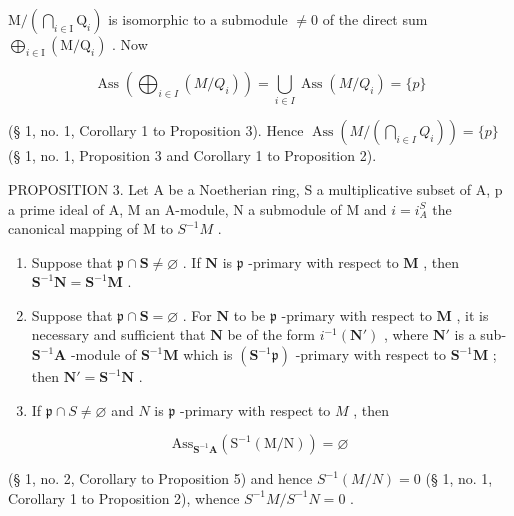 \(\mathrm{M}/\left(\bigcap_{i\in\mathrm{I}}\mathrm{Q}_{i}\right)\) is isomorphic to a submodule \(\neq0\) of the direct sum \(\bigoplus_{i\in\mathrm{I}}(\mathrm{M}/\mathrm{Q}_{i})\) . Now

\[
\operatorname{Ass} \left(\bigoplus_ {i \in I} (M / Q _ {i})\right) = \bigcup_ {i \in I} \operatorname{Ass} (M / Q _ {i}) = \{p \}
\]

(§ 1, no. 1, Corollary 1 to Proposition 3). Hence \(\operatorname{Ass}\left(M / \left(\bigcap_{i \in I} Q_i\right)\right) = \{p\}\) (§ 1, no. 1, Proposition 3 and Corollary 1 to Proposition 2).

PROPOSITION 3. Let A be a Noetherian ring, S a multiplicative subset of A, p a prime ideal of A, M an A-module, N a submodule of M and \(i = i_{A}^{S}\) the canonical mapping of M to \(S^{-1}M\) .

\begin{enumerate}
\def\labelenumi{(\roman{enumi})}
\item
  Suppose that \(\mathfrak{p} \cap \mathbf{S} \neq \varnothing\) . If \(\mathbf{N}\) is \(\mathfrak{p}\) -primary with respect to \(\mathbf{M}\) , then \(\mathbf{S}^{-1}\mathbf{N} = \mathbf{S}^{-1}\mathbf{M}\) .
\item
  Suppose that \(\mathfrak{p} \cap \mathbf{S} = \varnothing\) . For \(\mathbf{N}\) to be \(\mathfrak{p}\) -primary with respect to \(\mathbf{M}\) , it is necessary and sufficient that \(\mathbf{N}\) be of the form \(i^{-1}(\mathbf{N}')\) , where \(\mathbf{N}'\) is a sub- \(\mathbf{S}^{-1}\mathbf{A}\) -module of \(\mathbf{S}^{-1}\mathbf{M}\) which is \((\mathbf{S}^{-1}\mathfrak{p})\) -primary with respect to \(\mathbf{S}^{-1}\mathbf{M}\) ; then \(\mathbf{N}' = \mathbf{S}^{-1}\mathbf{N}\) .
\item
  If \(\mathfrak{p} \cap S \neq \varnothing\) and \(N\) is \(\mathfrak{p}\) -primary with respect to \(M\) , then
\end{enumerate}

\[
\mathrm{Ass} _ {\mathbf {S} ^ {- 1} \mathbf {A}} (\mathrm{S} ^ {- 1} (\mathrm{M} / \mathrm{N})) = \varnothing
\]

(§ 1, no. 2, Corollary to Proposition 5) and hence \(S^{-1}(M/N) = 0\) (§ 1, no. 1, Corollary 1 to Proposition 2), whence \(S^{-1}M/S^{-1}N = 0\) .

